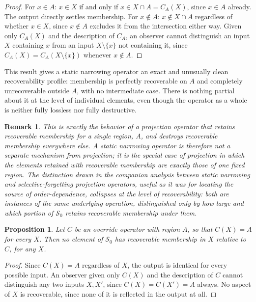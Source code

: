 \documentclass[11pt]{article}
\newtheorem{proposition}{Proposition}
\newtheorem{remark}{Remark}
\begin{document}
\begin{proof}
For $x \in A$: $x \in X$ if and only if $x \in X \cap A = C_A(X)$, since $x \in A$ already. The output directly settles membership. For $x \notin A$: $x \notin X \cap A$ regardless of whether $x \in X$, since $x \notin A$ excludes it from the intersection either way. Given only $C_A(X)$ and the description of $C_A$, an observer cannot distinguish an input $X$ containing $x$ from an input $X \setminus \{x\}$ not containing it, since $C_A(X) = C_A(X \setminus \{x\})$ whenever $x \notin A$.
\end{proof}

This result gives a static narrowing operator an exact and unusually clean recoverability profile: membership is perfectly recoverable on $A$ and completely unrecoverable outside $A$, with no intermediate case. There is nothing partial about it at the level of individual elements, even though the operator as a whole is neither fully lossless nor fully destructive.

\begin{remark}
This is exactly the behavior of a projection operator that retains recoverable membership for a single region, $A$, and destroys recoverable membership everywhere else. A static narrowing operator is therefore not a separate mechanism from projection; it is the special case of projection in which the elements retained with recoverable membership are exactly those of one fixed region. The distinction drawn in the companion analysis between static narrowing and selective-forgetting projection operators, useful as it was for locating the source of order-dependence, collapses at the level of recoverability: both are instances of the same underlying operation, distinguished only by how large and which portion of $\mathcal{S}_0$ retains recoverable membership under them.
\end{remark}

\begin{proposition}
Let $C$ be an override operator with region $A$, so that $C(X) = A$ for every $X$. Then no element of $\mathcal{S}_0$ has recoverable membership in $X$ relative to $C$, for any $X$.
\end{proposition}

\begin{proof}
Since $C(X) = A$ regardless of $X$, the output is identical for every possible input. An observer given only $C(X)$ and the description of $C$ cannot distinguish any two inputs $X, X'$, since $C(X) = C(X') = A$ always. No aspect of $X$ is recoverable, since none of it is reflected in the output at all.
\end{proof}
\end{document}
